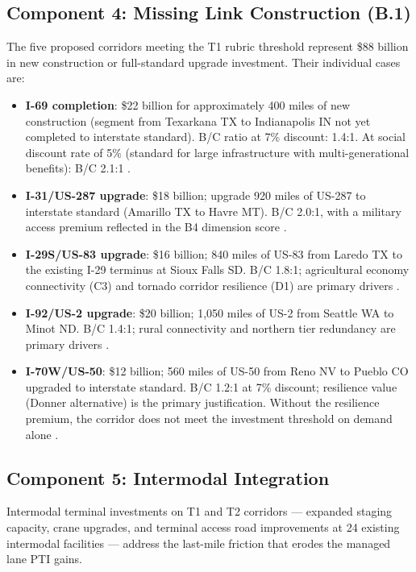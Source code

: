 \subsection{Component 4: Missing Link Construction (B.1)}

The five proposed corridors meeting the T1 rubric threshold represent \$88 billion in new construction or full-standard upgrade investment. Their individual cases are:

\begin{itemize}
  \item \textbf{I-69 completion}: \$22 billion for approximately 400 miles of new construction (segment from Texarkana TX to Indianapolis IN not yet completed to interstate standard). B/C ratio at 7\% discount: 1.4:1. At social discount rate of 5\% (standard for large infrastructure with multi-generational benefits): B/C 2.1:1 \citep{ROUTE_B1,ROUTE_C2}.
  \item \textbf{I-31/US-287 upgrade}: \$18 billion; upgrade 920 miles of US-287 to interstate standard (Amarillo TX to Havre MT). B/C 2.0:1, with a military access premium reflected in the B4 dimension score \citep{ROUTE_B1}.
  \item \textbf{I-29S/US-83 upgrade}: \$16 billion; 840 miles of US-83 from Laredo TX to the existing I-29 terminus at Sioux Falls SD. B/C 1.8:1; agricultural economy connectivity (C3) and tornado corridor resilience (D1) are primary drivers \citep{ROUTE_B1}.
  \item \textbf{I-92/US-2 upgrade}: \$20 billion; 1,050 miles of US-2 from Seattle WA to Minot ND. B/C 1.4:1; rural connectivity and northern tier redundancy are primary drivers \citep{ROUTE_B1}.
  \item \textbf{I-70W/US-50}: \$12 billion; 560 miles of US-50 from Reno NV to Pueblo CO upgraded to interstate standard. B/C 1.2:1 at 7\% discount; resilience value (Donner alternative) is the primary justification. Without the resilience premium, the corridor does not meet the investment threshold on demand alone \citep{ROUTE_D2}.
\end{itemize}

\subsection{Component 5: Intermodal Integration}

Intermodal terminal investments on T1 and T2 corridors --- expanded staging capacity, crane upgrades, and terminal access road improvements at 24 existing intermodal facilities --- address the last-mile friction that erodes the managed lane PTI gains.

